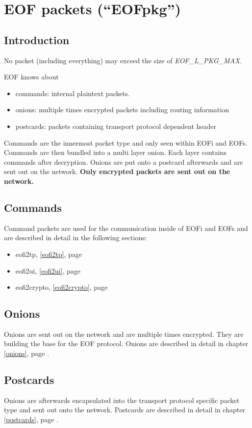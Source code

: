 \section{EOF packets ("`EOFpkg"')}
\label{eofpkg}
\subsection{Introduction}
No packet (including everything) may exceed the size of \emph{EOF\_L\_PKG\_MAX}.

EOF knows about
\begin{itemize}
\item commands: internal plaintext packets.
\item onions: multiple times encrypted packets including routing information
\item postcards: packets containing transport protocol dependent header
\end{itemize}
Commands are the innermost packet type and only seen within EOFi and EOFs.
Commands are then bundled into a multi layer onion. Each layer contains
commands after decryption.
Onions are put onto a postcard afterwards and are sent out on the network.
\textbf{Only encrypted packets are sent out on the network.}
\subsection{Commands}
Command packets are used for the communication inside of EOFi and EOFs and
are described in detail in the following sections:
\begin{itemize}
\item eofi2tp, \ref{eofi2tp}, page \pageref{eofi2tp}
\item eofi2ui, \ref{eofi2ui}, page \pageref{eofi2ui}
\item eofi2crypto, \ref{eofi2crypto}, page \pageref{eofi2crypto}
\end{itemize}
\subsection{Onions}
Onions are sent out on the network and are multiple times encrypted.
They are building the base for the EOF protocol.
Onions are described in detail in chapter \ref{onions}, page \pageref{onions}.
\subsection{Postcards}
Onions are afterwards encapsulated into the transport protocol specific
packet type and sent out onto the network.
Postcards are described in detail in chapter \ref{postcards}, page \pageref{postcards}.
